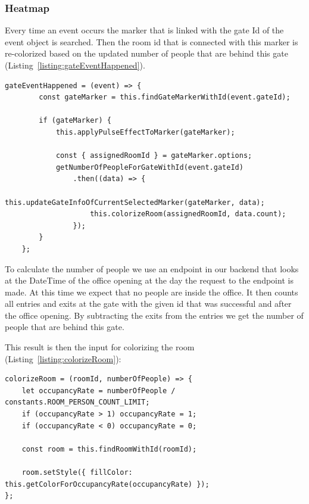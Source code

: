 \subsubsection{Heatmap}

Every time an event occurs the marker that is linked with the gate Id of the event object is searched. Then the room id that is connected with this marker is re-colorized based on the updated number of people that are behind this gate (Listing~\ref{listing:gateEventHappened}).

\clearpage

\begin{lstlisting}[label={listing:gateEventHappened},caption={Handling gate events in frontend}]
gateEventHappened = (event) => {
        const gateMarker = this.findGateMarkerWithId(event.gateId);

        if (gateMarker) {
            this.applyPulseEffectToMarker(gateMarker);

            const { assignedRoomId } = gateMarker.options;
            getNumberOfPeopleForGateWithId(event.gateId)
                .then((data) => {
                    this.updateGateInfoOfCurrentSelectedMarker(gateMarker, data);
                    this.colorizeRoom(assignedRoomId, data.count);
                });
        }
    };
\end{lstlisting}

To calculate the number of people we use an endpoint in our backend that looks at the DateTime of the office opening at the day the request to the endpoint is made. At this time we expect that no people are inside the office. It then counts all entries and exits at the gate with the given id that was successful and after the office opening. By subtracting the exits from the entries we get the number of people that are behind this gate.

This result is then the input for colorizing the room (Listing~\ref{listing:colorizeRoom}):

\begin{lstlisting}[label={listing:colorizeRoom},caption={Function for colorizing a room}]
colorizeRoom = (roomId, numberOfPeople) => {
    let occupancyRate = numberOfPeople / constants.ROOM_PERSON_COUNT_LIMIT;
    if (occupancyRate > 1) occupancyRate = 1;
    if (occupancyRate < 0) occupancyRate = 0;

    const room = this.findRoomWithId(roomId);

    room.setStyle({ fillColor: this.getColorForOccupancyRate(occupancyRate) });
};
\end{lstlisting}

